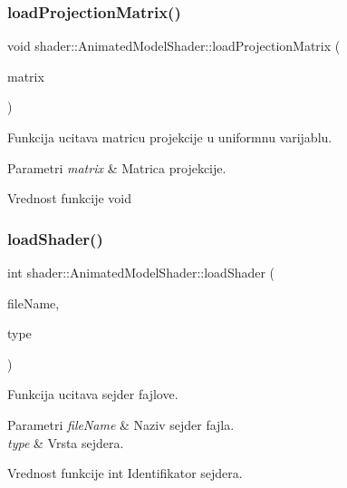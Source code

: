 \subsubsection{\texorpdfstring{load\+Projection\+Matrix()}{loadProjectionMatrix()}}
{\footnotesize\ttfamily void shader\+::\+Animated\+Model\+Shader\+::load\+Projection\+Matrix (\begin{DoxyParamCaption}\item[{mat4}]{matrix }\end{DoxyParamCaption})}



Funkcija ucitava matricu projekcije u uniformnu varijablu. 


\begin{DoxyParams}{Parametri}
{\em matrix} & Matrica projekcije. \\
\hline
\end{DoxyParams}
\begin{DoxyReturn}{Vrednost funkcije}
void 
\end{DoxyReturn}
\mbox{\label{classshader_1_1AnimatedModelShader_ae6e4523ce0246b3ff0cd0e2ee86cfc7b}} 
\subsubsection{\texorpdfstring{load\+Shader()}{loadShader()}}
{\footnotesize\ttfamily int shader\+::\+Animated\+Model\+Shader\+::load\+Shader (\begin{DoxyParamCaption}\item[{const char $\ast$}]{file\+Name,  }\item[{G\+Lenum}]{type }\end{DoxyParamCaption})\hspace{0.3cm}{\ttfamily [private]}}



Funkcija ucitava sejder fajlove. 


\begin{DoxyParams}{Parametri}
{\em file\+Name} & Naziv sejder fajla. \\
\hline
{\em type} & Vrsta sejdera. \\
\hline
\end{DoxyParams}
\begin{DoxyReturn}{Vrednost funkcije}
int Identifikator sejdera. 
\end{DoxyReturn}
\mbox{\label{classshader_1_1AnimatedModelShader_a4511391e6fb609b5f1207c3b5b7b567f}} 

